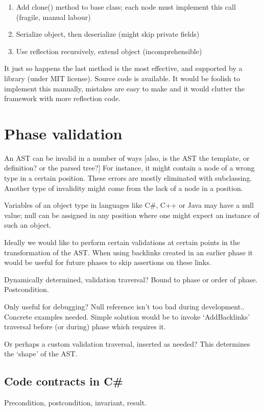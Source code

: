 \documentclass[final,a4paper,12pt]{article}
\begin{document}
\begin{enumerate}
	\item Add clone() method to base class; each node must implement this call (fragile, manual labour)
	\item Serialize object, then deserialize (might skip private fields)
	\item Use reflection recursively, extend object (incomprehensible)
\end{enumerate}

It just so happens the last method is the most effective, and supported by a library (under MIT license). Source code is available. It would be foolish to implement this manually, mistakes are easy to make and it would clutter the framework with more reflection code.

\section*{Phase validation}
An AST can be invalid in a number of ways [also, is the AST the template, or definition? or the parsed tree?] For instance, it might contain a node of a wrong type in a certain position. These errors are mostly eliminated with subclassing. Another type of invalidity might come from the lack of a node in a position.

Variables of an object type in languages like C\#, C++ or Java may have a null value; null can be assigned in any position where one might expect an instance of such an object.

Ideally we would like to perform certain validations at certain points in the transformation of the AST. When using backlinks created in an earlier phase it would be useful for future phases to skip assertions on these links.

Dynamically determined, validation traversal? Bound to phase or order of phase. Postcondition.

Only useful for debugging? Null reference isn't too bad during development.. Concrete examples needed. Simple solution would be to invoke `AddBacklinks' traversal before (or during) phase which requires it.

Or perhaps a custom validation traversal, inserted as needed? This determines the `shape' of the AST.

\subsection*{Code contracts in C\#}
Precondition, postcondition, invariant, result.
\end{document}
